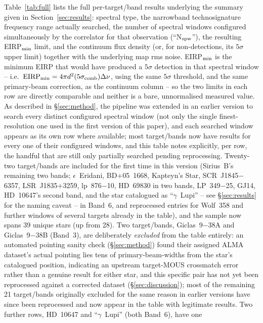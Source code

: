 \documentclass{openjournal}
\begin{document}
Table~\ref{tab:full} lists the full per-target/band results underlying the
summary given in Section~\ref{sec:results}: spectral type, the narrowband
technosignature frequency range actually searched, the number of spectral
windows configured simultaneously by the correlator for that observation
(``N$_{\rm spw}$''), the resulting EIRP$_{\rm min}$ limit, and the
continuum flux density (or, for non-detections, its $5\sigma$ upper
limit) together with the underlying map rms noise. EIRP$_{\rm min}$ is
the minimum EIRP that would have produced a $5\sigma$ detection in that
spectral window -- i.e.\ $\mathrm{EIRP_{min}} = 4\pi d^{2}(5\sigma_{\rm
comb})\Delta\nu$, using the same $5\sigma$ threshold, and the same
primary-beam correction, as the continuum column -- so the two limits in
each row are directly comparable and neither is a bare, unnormalised
measured value. As described in \S\ref{sec:method}, the pipeline was
extended in an earlier version to search every distinct configured
spectral window (not only the single finest-resolution one used in the
first version of this paper), and each searched window appears as its
own row where available; most target/bands now have results for every
one of their configured windows, and this table notes explicitly, per
row, the handful that are still only partially searched pending
reprocessing. Twenty-two target/bands are included for the first time in
this version (Sirius~B's remaining two bands; $\epsilon$~Eridani,
BD$+$05~1668, Kapteyn's Star, SCR~J1845$-$6357, LSR~J1835$+$3259,
lp~876$-$10, HD~69830 in two bands, LP~349$-$25, GJ14, HD~10647's second
band, and the star catalogued as ``$\gamma$~Lupi'' -- see
\S\ref{sec:results} for the naming caveat -- in Band~6, and reprocessed
entries for Wolf~358 and further windows of several targets already in
the table), and the sample now spans 39 unique stars (up from 28). Two
target/bands, Giclas~9$-$38A and Giclas~9$-$38B (Band~3), are
deliberately \emph{excluded} from the table entirely: an automated
pointing sanity check (\S\ref{sec:method}) found their assigned ALMA
dataset's actual pointing lies tens of primary-beam-widths from the
star's catalogued position, indicating an upstream target-MOUS
crossmatch error rather than a genuine result for either star, and this
specific pair has not yet been reprocessed against a corrected dataset
(\S\ref{sec:discussion}); most of the remaining 21 target/bands
originally excluded for the same reason in earlier versions have since
been reprocessed and now appear in the table with legitimate results.
Two further rows, HD~10647 and ``$\gamma$~Lupi'' (both Band~6), have one
\end{document}
